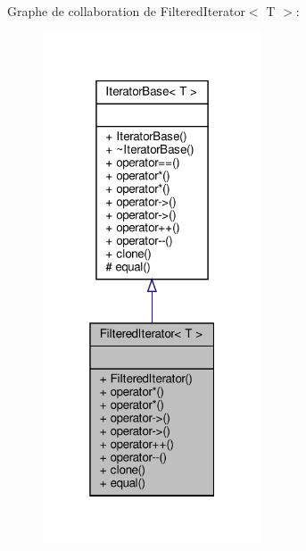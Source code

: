 Graphe de collaboration de Filtered\+Iterator$<$ T $>$\+:\nopagebreak
\begin{figure}[H]
\begin{center}
\leavevmode
\includegraphics[width=184pt]{class_filtered_iterator__coll__graph}
\end{center}
\end{figure}
